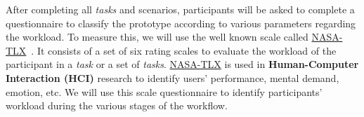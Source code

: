 After completing all \textit{tasks} and scenarios, participants will be asked to complete a questionnaire to classify the prototype according to various parameters regarding the workload. To measure this, we will use the well known scale called \hyperlink{https://en.wikipedia.org/wiki/NASA-TLX}{NASA-TLX}~\cite{ramkumar2017using}. It consists of a set of six rating scales to evaluate the workload of the participant in a \textit{task} or a set of \textit{tasks}. \hyperlink{https://en.wikipedia.org/wiki/NASA-TLX}{NASA-TLX} is used in \textbf{Human-Computer Interaction (HCI)} research to identify users' performance, mental demand, emotion, etc. We will use this scale questionnaire to identify participants' workload during the various stages of the workflow.

